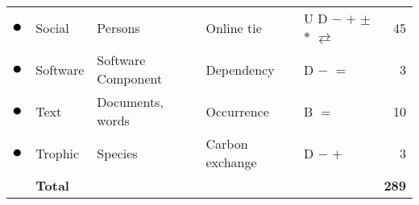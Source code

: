 \begin{tabular}{lllllr}
\textcolor{colorSocial}{$\newmoon$} &Social & Persons & Online tie & U D \phantom{B} $-$ \phantom{$=$} $+$ $\pm$ \phantom{$\stackrel{+}{=}$} $*$ \phantom{$_*{}^*$} $\rightleftarrows$ \phantom{$++$}  &  45\\
\textcolor{colorSoftware}{$\newmoon$} &Software & Software Component & Dependency & \phantom{U} D \phantom{B} $-$ $=$ \phantom{$+$} \phantom{$\pm$} \phantom{$\stackrel{+}{=}$} \phantom{$*$} \phantom{$_*{}^*$} \phantom{$\rightleftarrows$} \phantom{$++$}  &  3\\
\textcolor{colorText}{$\newmoon$} &Text & Documents, words & Occurrence & \phantom{U} \phantom{D} B \phantom{$-$} $=$ \phantom{$+$} \phantom{$\pm$} \phantom{$\stackrel{+}{=}$} \phantom{$*$} \phantom{$_*{}^*$} \phantom{$\rightleftarrows$} \phantom{$++$}  &  10\\
\textcolor{colorTrophic}{$\newmoon$} &Trophic & Species & Carbon exchange & \phantom{U} D \phantom{B} $-$ \phantom{$=$} $+$ \phantom{$\pm$} \phantom{$\stackrel{+}{=}$} \phantom{$*$} \phantom{$_*{}^*$} \phantom{$\rightleftarrows$} \phantom{$++$}  &  3\\
\midrule
& \textbf{Total} &&&& \textbf{289}\\
\bottomrule
\end{tabular}

